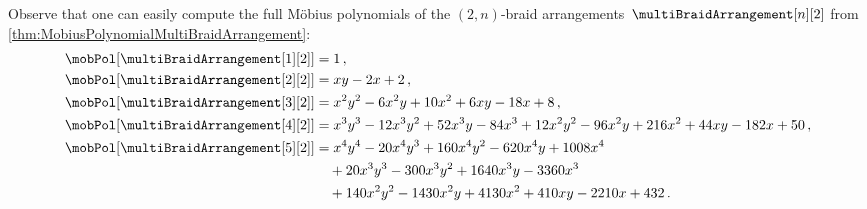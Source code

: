 \documentclass{amsart}
\theoremstyle{definition}
\begin{document}
Observe that one can easily compute the full M\"obius polynomials of the $(2,n)$-braid arrangements~$\multiBraidArrangement[n][2]$ from \cref{thm:MobiusPolynomialMultiBraidArrangement}:
\begin{align*}
\mobPol[{\multiBraidArrangement[1][2]}] & = 1 \, , \\
\mobPol[{\multiBraidArrangement[2][2]}] & = x y - 2 x + 2 \, , \\
\mobPol[{\multiBraidArrangement[3][2]}] & = x^2 y^2 - 6 x^2 y + 10 x^2 + 6 x y - 18 x + 8 \, , \\
\mobPol[{\multiBraidArrangement[4][2]}] & = x^3 y^3 - 12 x^3 y^2 + 52 x^3 y - 84 x^3 + 12 x^2 y^2 - 96 x^2 y + 216 x^2 + 44 x y - 182 x + 50 \, , \\
\mobPol[{\multiBraidArrangement[5][2]}] & = x^4 y^4 - 20 x^4 y^3 + 160 x^4 y^2 - 620 x^4 y + 1008 x^4 \\ & \quad+ 20 x^3 y^3 - 300 x^3 y^2 + 1640 x^3 y - 3360 x^3 \\ & \quad+ 140 x^2 y^2 - 1430 x^2 y + 4130 x^2 + 410 x y - 2210 x + 432 \, .
\end{align*}
\end{document}
